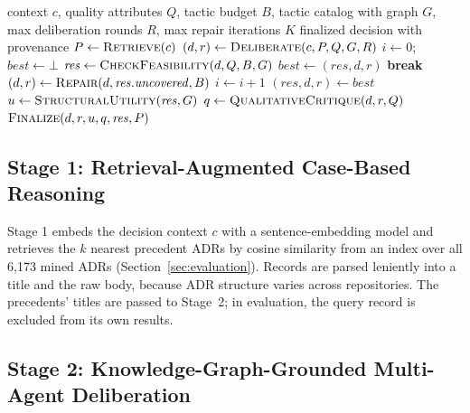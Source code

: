\documentclass[preprint,12pt,authoryear]{elsarticle}
\renewcommand{\_}{\textunderscore\allowbreak{}}
\begin{document}
\begin{algorithm}[t]
\caption{CADENCE}
\label{alg:cadence}
\begin{algorithmic}[1]
\REQUIRE context $c$, quality attributes $Q$, tactic budget $B$, tactic catalog with graph $G$, max deliberation rounds $R$, max repair iterations $K$
\ENSURE finalized decision with provenance
\STATE $P \gets \textsc{Retrieve}(c)$ 
\STATE $(d, r) \gets \textsc{Deliberate}(c, P, Q, G, R)$ 
\STATE $i \gets 0$; $\mathit{best} \gets \bot$
\LOOP
  \STATE $\mathit{res} \gets \textsc{CheckFeasibility}(d, Q, B, G)$ 
    \STATE $\mathit{best} \gets (\mathit{res}, d, r)$ 
  \ENDIF
    \STATE \textbf{break} 
  \ENDIF
  \STATE $(d, r) \gets \textsc{Repair}(d, \mathit{res}.\mathit{uncovered}, B)$ 
  \STATE $i \gets i + 1$
\ENDLOOP
\STATE $(\mathit{res}, d, r) \gets \mathit{best}$ 
\STATE $u \gets \textsc{StructuralUtility}(\mathit{res}, G)$ 
\STATE $q \gets \textsc{QualitativeCritique}(d, r, Q)$ 
\RETURN $\textsc{Finalize}(d, r, u, q, \mathit{res}, P)$
\end{algorithmic}
\end{algorithm}

\subsection{Stage 1: Retrieval-Augmented Case-Based Reasoning}

Stage 1 embeds the decision context $c$ with a sentence-embedding model and retrieves the $k$ nearest precedent ADRs by cosine similarity from an index over all 6{,}173 mined ADRs (Section~\ref{sec:evaluation}). Records are parsed leniently into a title and the raw body, because ADR structure varies across repositories. The precedents' titles are passed to Stage~2; in evaluation, the query record is excluded from its own results.

\subsection{Stage 2: Knowledge-Graph-Grounded Multi-Agent Deliberation}
\end{document}
